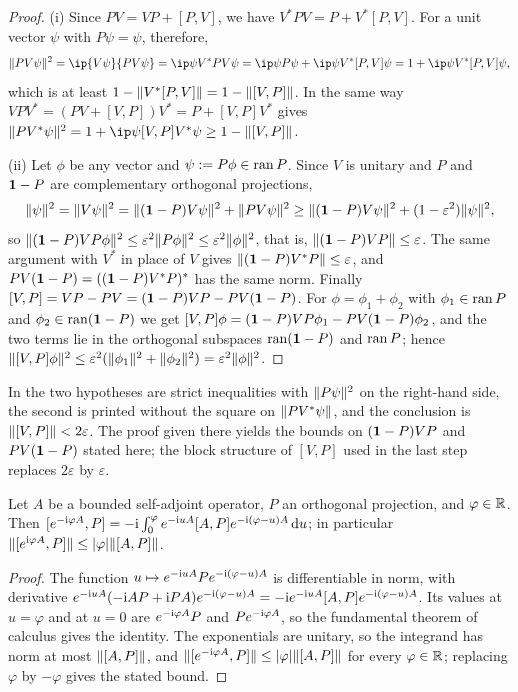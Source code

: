 \begin{proof}
(i) Since $PV=VP+[P,V]$, we have $V^*PV=P+V^*[P,V]$. For a unit vector $\psi$ with $P\psi=\psi$, therefore,
\[
\norm{PV\psi}^2=\ip{V\psi}{PV\psi}=\ip\psi{V^*PV\psi}=\ip\psi{P\psi}+\ip\psi{V^*[P,V]\psi}=1+\ip\psi{V^*[P,V]\psi},
\]
which is at least $1-\lVert V^*[P,V]\rVert=1-\lVert[V,P]\rVert$. In the same way $VPV^*=(PV+[V,P])V^*=P+[V,P]V^*$ gives
$\norm{PV^*\psi}^2=1+\ip\psi{[V,P]V^*\psi}\ge1-\norm{[V,P]}$.

(ii) Let $\phi$ be any vector and $\psi:=P\phi\in\operatorname{ran} P$. Since $V$ is unitary and $P$ and $\mathbf{1}-P$ are complementary
orthogonal projections,
\[
\lVert\psi\rVert^2=\lVert V\psi\rVert^2=\lVert(\mathbf{1}-P)V\psi\rVert^2+\lVert PV\psi\rVert^2\ge\lVert(\mathbf{1}-P)V\psi\rVert^2+(1-\varepsilon^2)\lVert\psi\rVert^2 ,
\]
so $\lVert(\mathbf{1}-P)VP\phi\rVert^2\le\varepsilon^2\lVert P\phi\rVert^2\le\varepsilon^2\lVert\phi\rVert^2$, that is, $\lVert(\mathbf{1}-P)VP\rVert\le\varepsilon$. The same
argument with $V^*$ in place of $V$ gives $\lVert(\mathbf{1}-P)V^*P\rVert\le\varepsilon$, and $PV(\mathbf{1}-P)=((\mathbf{1}-P)V^*P)^*$ has the same
norm. Finally $[V,P]=VP-PV=(\mathbf{1}-P)VP-PV(\mathbf{1}-P)$. For $\phi=\phi_1+\phi_2$ with $\phi_1\in\operatorname{ran} P$ and
$\phi_2\in\operatorname{ran}(\mathbf{1}-P)$ we get $[V,P]\phi=(\mathbf{1}-P)VP\phi_1-PV(\mathbf{1}-P)\phi_2$, and the two terms lie in the orthogonal
subspaces $\operatorname{ran}(\mathbf{1}-P)$ and $\operatorname{ran} P$; hence $\lVert[V,P]\phi\rVert^2\le\varepsilon^2(\lVert\phi_1\rVert^2+\lVert\phi_2\rVert^2)=\varepsilon^2\lVert\phi\rVert^2$.
\end{proof}

In \cite[Lemma~4.1(ii)]{BBDF21} the two hypotheses are strict inequalities with $\lVert P\psi\rVert^2$ on the right-hand side,
the second is printed without the square on $\lVert PV^*\psi\rVert$, and the conclusion is $\lVert[V,P]\rVert<2\varepsilon$. The proof
given there yields the bounds on $(\mathbf{1}-P)VP$ and $PV(\mathbf{1}-P)$ stated here; the block structure of $[V,P]$ used in the
last step replaces $2\varepsilon$ by $\varepsilon$.

\begin{lemma}\label{lem:bbdf43}
Let $A$ be a bounded self-adjoint operator, $P$ an orthogonal projection, and $\varphi\in\mathbb{R}$. Then
$[e^{-\mathrm{i}\varphi A},P]=-\mathrm{i}\int_0^\varphi e^{-\mathrm{i} uA}[A,P]e^{-\mathrm{i}(\varphi-u)A}\,\mathrm{d} u$; in particular
$\lVert[e^{\mathrm{i}\varphi A},P]\rVert\le\lvert\varphi\rvert\lVert[A,P]\rVert$.
\end{lemma}

\begin{proof}
The function $u\mapsto e^{-\mathrm{i} uA}Pe^{-\mathrm{i}(\varphi-u)A}$ is differentiable in norm, with derivative
$e^{-\mathrm{i} uA}(-\mathrm{i} AP+\mathrm{i} PA)e^{-\mathrm{i}(\varphi-u)A}=-\mathrm{i} e^{-\mathrm{i} uA}[A,P]e^{-\mathrm{i}(\varphi-u)A}$. Its values at $u=\varphi$ and at
$u=0$ are $e^{-\mathrm{i}\varphi A}P$ and $Pe^{-\mathrm{i}\varphi A}$, so the fundamental theorem of calculus gives the identity. The
exponentials are unitary, so the integrand has norm at most $\lVert[A,P]\rVert$, and
$\lVert[e^{-\mathrm{i}\varphi A},P]\rVert\le\lvert\varphi\rvert\lVert[A,P]\rVert$ for every $\varphi\in\mathbb{R}$; replacing $\varphi$ by $-\varphi$ gives the stated
bound.
\end{proof}

